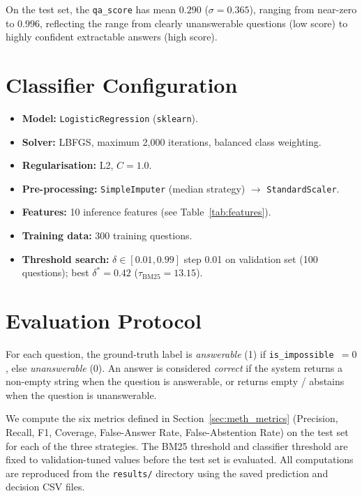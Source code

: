 On the test set, the \texttt{qa\_score} has mean $0.290$ ($\sigma = 0.365$),
ranging from near-zero to $0.996$, reflecting the range from clearly
unanswerable questions (low score) to highly confident extractable answers
(high score).

\section{Classifier Configuration}
\label{sec:exp_classifier_config}

\begin{itemize}
  \item \textbf{Model:} \texttt{LogisticRegression} (\texttt{sklearn}).
  \item \textbf{Solver:} LBFGS, maximum 2,000 iterations, balanced class weighting.
  \item \textbf{Regularisation:} L2, $C = 1.0$.
  \item \textbf{Pre-processing:} \texttt{SimpleImputer} (median strategy) $\rightarrow$
        \texttt{StandardScaler}.
  \item \textbf{Features:} 10 inference features (see Table~\ref{tab:features}).
  \item \textbf{Training data:} 300 training questions.
  \item \textbf{Threshold search:} $\delta \in [0.01, 0.99]$ step 0.01 on
        validation set (100 questions); best $\delta^* = 0.42$ ($\tau_{\text{BM25}} = 13.15$).
\end{itemize}

\section{Evaluation Protocol}
\label{sec:exp_eval_protocol}

For each question, the ground-truth label is \emph{answerable} (1) if
\texttt{is\_impossible}~$= 0$, else \emph{unanswerable} (0). An answer is
considered \emph{correct} if the system returns a non-empty string when the
question is answerable, or returns empty / abstains when the question is
unanswerable.

We compute the six metrics defined in Section~\ref{sec:meth_metrics}
(Precision, Recall, F1, Coverage, False-Answer Rate, False-Abstention Rate) on
the test set for each of the three strategies. The BM25 threshold and
classifier threshold are fixed to validation-tuned values before the test set
is evaluated. All computations are reproduced from the \texttt{results/}
directory using the saved prediction and decision CSV files.
